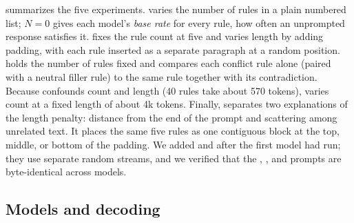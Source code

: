  summarizes the five experiments.
\expA varies the number of rules in a plain numbered list; $N{=}0$ gives each model's {\em base rate} for every rule, \ie how often an unprompted response satisfies it.
\expB fixes the rule count at five and varies length by adding padding, with each rule inserted as a separate paragraph at a random position.
\expD holds the number of rules fixed and compares each conflict rule alone (paired with a neutral filler rule) to the same rule together with its contradiction.
Because \expA confounds count and length (40 rules take about 570 tokens), \expE varies count at a fixed length of about 4k tokens.
Finally, \expF separates two explanations of the length penalty: distance from the end of the prompt and scattering among unrelated text.
It places the same five rules as one contiguous block at the top, middle, or bottom of the padding.
We added \expE and \expF after the first model had run; they use separate random streams, and we verified that the \expA, \expB, and \expD prompts are byte-identical across models.

\subsection{Models and decoding}

\begin{table}[t]
    \centering
    \caption{Models. AWQ int4 checkpoints were used where shared-GPU memory did not allow bf16. Coverage marks which experiments finished for each model.}
    \label{tab:models}
\end{table}

